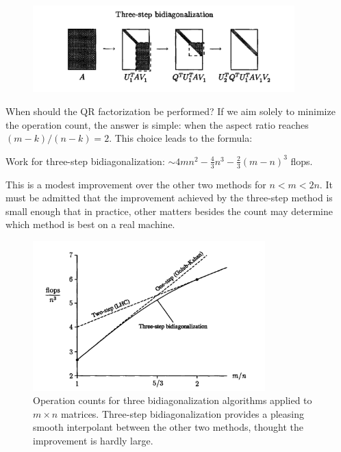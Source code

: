 \begin{figure}[H]
    \centering
    \includegraphics[width=0.9\textwidth]{figures/31-4.png}
\end{figure}

When should the QR factorization be performed? If we aim solely to minimize the operation count, the answer is simple: when the aspect ratio reaches $ (m-k)/(n-k) = 2 $. This choice leads to the formula: 


\begin{corollary}
\label{cor: cost of three-step bidiagonalization}
Work for three-step bidiagonalization: $ \sim 4mn^{2}  - \frac{4}{3}n^3 - \frac{2}{3}(m-n)^3 $ flops. 
\end{corollary}
This is a modest improvement over the other two methods for $n<m<2n$.  It must be admitted that the improvement achieved by the three-step method is small enough that in practice, other matters besides the count may determine which method is best on a real machine. 

\begin{figure}[H]
    \centering
    \includegraphics[width=0.8\textwidth]{figures/31-5.png}
    \caption{Operation counts for three bidiagonalization algorithms applied to $ m\times n $ matrices. Three-step bidiagonalization provides a pleasing smooth interpolant between the other two methods, thought the improvement is hardly large.}
\end{figure}

